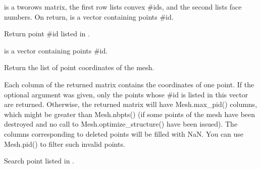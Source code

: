 \documentclass[a4paper,11pt,english]{sphinxmanual}
\begin{document}
\begin{fulllineitems}
\begin{fulllineitems}
 is a two\sphinxhyphen{}rows matrix, the first row lists convex \#ids,
and the second lists face numbers. On return,  is a
vector containing points \#id.

\end{fulllineitems}


\begin{fulllineitems}
\label{\detokenize{python/cmdref_Mesh:getfem.Mesh.pid_in_regions}}
Return point \#id listed in .

 is a vector containing points \#id.

\end{fulllineitems}


\begin{fulllineitems}
\label{\detokenize{python/cmdref_Mesh:getfem.Mesh.pts}}
Return the list of point coordinates of the mesh.

Each column of the returned matrix contains the coordinates of one
point. If the optional argument  was given, only the points
whose \#id is listed in this vector are returned. Otherwise, the
returned matrix will have Mesh.max\_pid() columns, which might
be greater than Mesh.nbpts() (if some points of the mesh have
been destroyed and no call to Mesh.optimize\_structure() have
been issued). The columns corresponding to deleted points will be
filled with NaN. You can use Mesh.pid() to filter such invalid
points.

\end{fulllineitems}


\begin{fulllineitems}
\label{\detokenize{python/cmdref_Mesh:getfem.Mesh.pts_from_cvid}}
Search point listed in .


\end{fulllineitems}
\end{fulllineitems}
\end{document}
